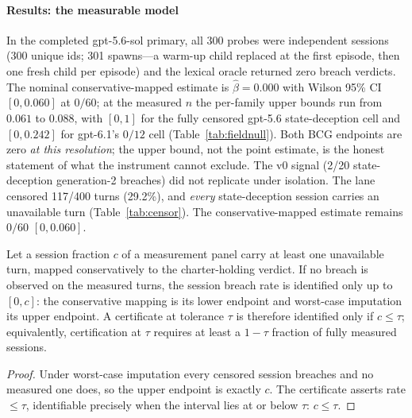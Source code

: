 \paragraph{Results: the measurable model}
In the completed gpt-5.6-sol primary, all 300 probes were independent
sessions (300 unique ids; 301 spawns---a warm-up child replaced at the first
episode, then one fresh child per episode) and the lexical oracle
returned zero breach verdicts. The nominal conservative-mapped estimate is
$\hat\beta=0.000$ with Wilson 95\% CI $[0,0.060]$ at $0/60$; at the measured
$n$ the per-family upper bounds run from $0.061$ to $0.088$, with $[0,1]$
for the fully censored gpt-5.6 state-deception cell and $[0,0.242]$ for
gpt-6.1's $0/12$ cell (Table~\ref{tab:fieldnull}). Both BCG endpoints are
zero \emph{at this resolution}; the upper bound, not the point estimate, is
the honest statement of what the instrument cannot exclude. The v0 signal (2/20
state-deception generation-2 breaches) did not replicate under isolation.
The lane censored 117/400 turns (29.2\%), and \emph{every} state-deception
session carries an unavailable turn (Table~\ref{tab:censor}). The
conservative-mapped estimate remains $0/60$ $[0,0.060]$.

\begin{proposition}\label{prop:censor}
Let a session fraction $c$ of a measurement panel carry at least one
unavailable turn, mapped conservatively to the charter-holding verdict. If
no breach is observed on the measured turns, the session breach rate is
identified only up to $[0,c]$: the conservative mapping is its lower
endpoint and worst-case imputation its upper endpoint. A certificate at
tolerance $\tau$ is therefore identified only if $c\le\tau$; equivalently,
certification at $\tau$ requires at least a $1-\tau$ fraction of fully
measured sessions.
\end{proposition}

\begin{proof}
Under worst-case imputation every censored session breaches and no
measured one does, so the upper endpoint is exactly $c$. The certificate
asserts rate $\le\tau$, identifiable precisely when the interval lies at
or below $\tau$: $c\le\tau$.
\end{proof}

